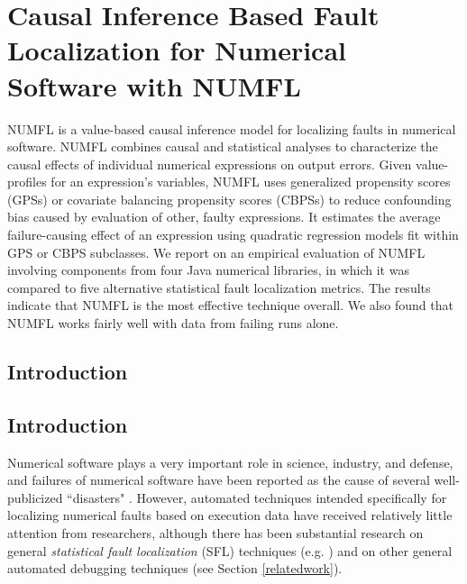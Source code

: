 \chapter{Causal Inference Based Fault Localization for Numerical Software with NUMFL}\label{chap:NUMFL}

NUMFL is a value-based causal inference model for localizing faults in numerical software.  NUMFL combines causal and statistical analyses to characterize the causal effects of individual numerical expressions on output errors.  Given value-profiles for an expression's variables, NUMFL uses generalized propensity scores (GPSs) or covariate balancing propensity scores (CBPSs) to reduce confounding bias caused by evaluation of other, faulty expressions.  It estimates the average failure-causing effect of an expression using quadratic regression models fit within GPS or CBPS subclasses.  We report on an empirical evaluation of NUMFL involving components from four Java numerical libraries, in which it was compared to five alternative statistical fault localization metrics.  The results indicate that NUMFL is the most effective technique overall. We also found that NUMFL works fairly well with data from failing runs alone.

\section{Introduction}\label{introduction}

\section{Introduction}
\vspace{-2pt}
Numerical software plays a very important role in science, industry, and defense, and failures of numerical software have been reported as the cause of several well-publicized ``disasters" \cite{VuikWeb,Kanewala2014}.  However, automated techniques intended specifically for localizing numerical faults based on execution data have received relatively little attention from researchers, although there has been substantial research on general {\it statistical fault localization} (SFL) techniques (e.g. \cite{Jones2002,Liblit2004,Liu2005}) and on other general automated debugging techniques (see Section \ref{relatedwork}).

